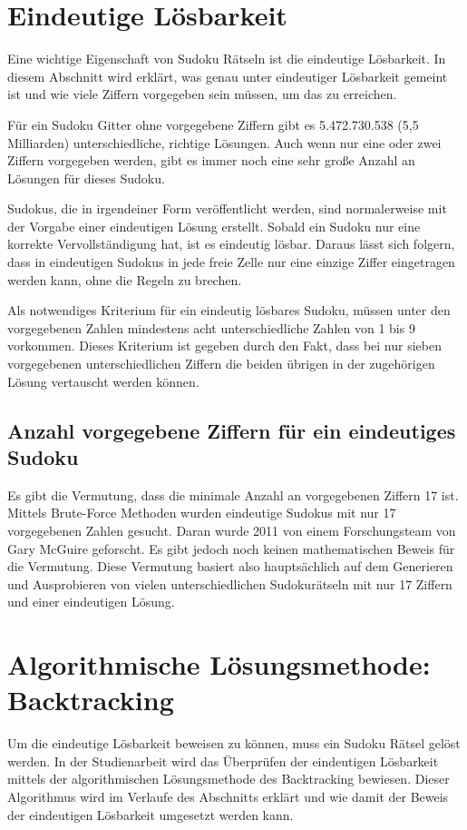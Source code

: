 \section{Eindeutige Lösbarkeit}\label{eindeutigLösbar}
Eine wichtige Eigenschaft von Sudoku Rätseln ist die eindeutige Lösbarkeit. In diesem Abschnitt wird erklärt, was genau unter eindeutiger Lösbarkeit gemeint ist und wie viele Ziffern vorgegeben sein müssen, um das zu erreichen.

Für ein Sudoku Gitter ohne vorgegebene Ziffern gibt es 5.472.730.538 (5,5 Milliarden) unterschiedliche, richtige Lösungen. Auch wenn nur eine oder zwei Ziffern vorgegeben werden, gibt es immer noch eine sehr große Anzahl an Lösungen für dieses Sudoku. 

Sudokus, die in irgendeiner Form veröffentlicht werden, sind normalerweise mit der Vorgabe einer eindeutigen Lösung erstellt. Sobald ein Sudoku nur eine korrekte Vervollständigung hat, ist es eindeutig lösbar. Daraus lässt sich folgern, dass in eindeutigen Sudokus in jede freie Zelle nur eine einzige Ziffer eingetragen werden kann, ohne die Regeln zu brechen.

Als notwendiges Kriterium für ein eindeutig lösbares Sudoku, müssen unter den vorgegebenen Zahlen mindestens acht unterschiedliche Zahlen von 1 bis 9 vorkommen. Dieses Kriterium ist gegeben durch den Fakt, dass bei nur sieben vorgegebenen unterschiedlichen Ziffern die beiden übrigen in der zugehörigen Lösung vertauscht werden können. \cite{HerzbergMurty} \cite[95\psqq]{althofer2014spiele}

\subsection{Anzahl vorgegebene Ziffern für ein eindeutiges Sudoku}  
Es gibt die Vermutung, dass die minimale Anzahl an vorgegebenen Ziffern 17 ist. Mittels Brute-Force Methoden wurden eindeutige Sudokus mit nur 17 vorgegebenen Zahlen gesucht. Daran wurde 2011 von einem Forschungsteam von Gary McGuire geforscht. Es gibt jedoch noch keinen mathematischen Beweis für die Vermutung. Diese Vermutung basiert also hauptsächlich auf dem Generieren und Ausprobieren von vielen unterschiedlichen Sudokurätseln mit nur 17 Ziffern und einer eindeutigen Lösung. \cite{FAZ} \cite[95\psqq]{althofer2014spiele}

\section{Algorithmische Lösungsmethode: Backtracking}
Um die eindeutige Lösbarkeit beweisen zu können, muss ein Sudoku Rätsel gelöst werden. In der Studienarbeit wird das Überprüfen der eindeutigen Lösbarkeit mittels der algorithmischen Lösungsmethode des Backtracking bewiesen. Dieser Algorithmus wird im Verlaufe des Abschnitts erklärt und wie damit der Beweis der eindeutigen Lösbarkeit umgesetzt werden kann.

